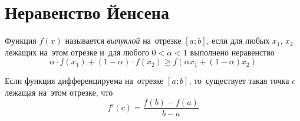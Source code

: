 

\section*{Неравенство Йенсена}


Функция $f(x)$ называется \emph{выпуклой} на~отрезке $[a; b]$, если для любых
$x_1$, $x_2$ лежащих на~этом отрезке и~для любого $0 < \alpha < 1$ выполнено
неравенство
\[
    \alpha \cdot f(x_1) + (1 - \alpha) \cdot f(x_2)
\geq
    f(\alpha x_1 + (1 - \alpha) x_2)
\]

Если функция дифференцируема на~отрезке $[a; b]$, то~существует такая точка $c$
лежащая на~этом отрезке, что
\[
    f'(c) = \frac{f(b) - f(a)}{b - a}
\]

